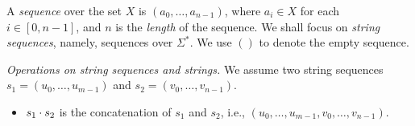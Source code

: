 
A \emph{sequence} over the set $X$ is $(a_0, \ldots, a_{n-1})$, where $a_i \in X$ for each $i \in [0,n-1]$, and $n$ is the \emph{length} of the sequence.
We shall focus on \emph{string sequences}, namely, sequences over $\Sigma^*$. We use $()$ to denote the empty sequence.

\smallskip
\noindent\emph{Operations on string sequences and strings.} %
We assume two string sequences $s_1 = (u_0, \ldots, u_{m-1})$ and  $s_2 = (v_0, \ldots, v_{n-1})$.
\begin{itemize}%
	\item $s_1 \cdot s_2$ is the concatenation of $s_1$ and $s_2$, i.e., $(u_0, \ldots, u_{m-1}, v_0, \ldots, v_{n-1})$.


\end{itemize}
